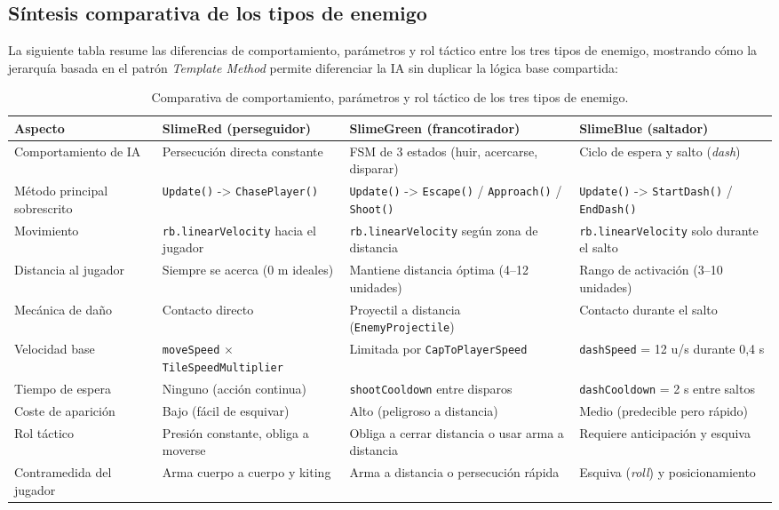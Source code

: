\subsection{Síntesis comparativa de los tipos de enemigo}


La siguiente tabla resume las diferencias de comportamiento, parámetros y rol táctico entre los tres tipos de enemigo, mostrando cómo la jerarquía basada en el patrón \textit{Template Method} permite diferenciar la IA sin duplicar la lógica base compartida:

\begin{table}[H]
\centering
{\small
\begin{tabular}{|p{}|p{}|p{}|p{}|}
\hline
\textbf{Aspecto} & \textbf{SlimeRed (perseguidor)} & \textbf{SlimeGreen (francotirador)} & \textbf{SlimeBlue (saltador)} \\ \hline
Comportamiento de IA & Persecución directa constante & FSM de 3 estados (huir, acercarse, disparar) & Ciclo de espera y salto (\textit{dash}) \\ \hline
Método principal sobrescrito & \texttt{Update()} -> \texttt{ChasePlayer()} & \texttt{Update()} -> \texttt{Escape()} / \texttt{Approach()} / \texttt{Shoot()} & \texttt{Update()} -> \texttt{StartDash()} / \texttt{EndDash()} \\ \hline
Movimiento & \texttt{rb.linearVelocity} hacia el jugador & \texttt{rb.linearVelocity} según zona de distancia & \texttt{rb.linearVelocity} solo durante el salto \\ \hline
Distancia al jugador & Siempre se acerca (0 m ideales) & Mantiene distancia óptima (4–12 unidades) & Rango de activación (3–10 unidades) \\ \hline
Mecánica de daño & Contacto directo & Proyectil a distancia (\texttt{EnemyProjectile}) & Contacto durante el salto \\ \hline
Velocidad base & \texttt{moveSpeed} $\times$ \texttt{TileSpeedMultiplier} & Limitada por \texttt{CapToPlayerSpeed} & \texttt{dashSpeed} = 12 u/s durante 0,4 s \\ \hline
Tiempo de espera & Ninguno (acción continua) & \texttt{shootCooldown} entre disparos & \texttt{dashCooldown} = 2 s entre saltos \\ \hline
Coste de aparición & Bajo (fácil de esquivar) & Alto (peligroso a distancia) & Medio (predecible pero rápido) \\ \hline
Rol táctico & Presión constante, obliga a moverse & Obliga a cerrar distancia o usar arma a distancia & Requiere anticipación y esquiva \\ \hline
Contramedida del jugador & Arma cuerpo a cuerpo y kiting & Arma a distancia o persecución rápida & Esquiva (\textit{roll}) y posicionamiento \\ \hline
\end{tabular}
}
\caption{Comparativa de comportamiento, parámetros y rol táctico de los tres tipos de enemigo.}
\end{table}

